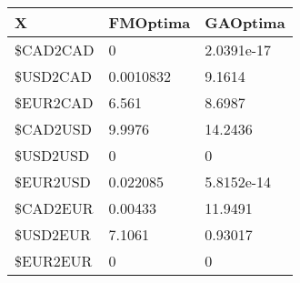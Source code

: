 \begin{tabular}{lll}
X & FMOptima & GAOptima \\ 
\hline 
\$CAD2CAD & 0 & 2.0391e-17 \\ 
\$USD2CAD & 0.0010832 & 9.1614 \\ 
\$EUR2CAD & 6.561 & 8.6987 \\ 
\$CAD2USD & 9.9976 & 14.2436 \\ 
\$USD2USD & 0 & 0 \\ 
\$EUR2USD & 0.022085 & 5.8152e-14 \\ 
\$CAD2EUR & 0.00433 & 11.9491 \\ 
\$USD2EUR & 7.1061 & 0.93017 \\ 
\$EUR2EUR & 0 & 0 \\ 
\hline 
\end{tabular}